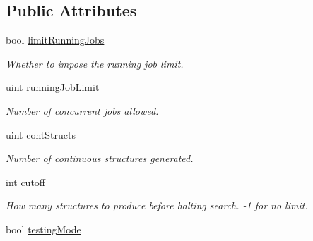 \subsection*{Public Attributes}
\begin{DoxyCompactItemize}
\item 
\hypertarget{classGlobalSearch_1_1OptBase_a3b5202a4793e24dd7d42d1df9e94ee27}{}bool \hyperlink{classGlobalSearch_1_1OptBase_a3b5202a4793e24dd7d42d1df9e94ee27}{limit\+Running\+Jobs}\label{classGlobalSearch_1_1OptBase_a3b5202a4793e24dd7d42d1df9e94ee27}

\begin{DoxyCompactList}\small\item\em Whether to impose the running job limit. \end{DoxyCompactList}\item 
\hypertarget{classGlobalSearch_1_1OptBase_a02fd48b57bdd72ec4a4c20209967bd07}{}uint \hyperlink{classGlobalSearch_1_1OptBase_a02fd48b57bdd72ec4a4c20209967bd07}{running\+Job\+Limit}\label{classGlobalSearch_1_1OptBase_a02fd48b57bdd72ec4a4c20209967bd07}

\begin{DoxyCompactList}\small\item\em Number of concurrent jobs allowed. \end{DoxyCompactList}\item 
\hypertarget{classGlobalSearch_1_1OptBase_a973fbcff3e2abbc66c19236092439ce1}{}uint \hyperlink{classGlobalSearch_1_1OptBase_a973fbcff3e2abbc66c19236092439ce1}{cont\+Structs}\label{classGlobalSearch_1_1OptBase_a973fbcff3e2abbc66c19236092439ce1}

\begin{DoxyCompactList}\small\item\em Number of continuous structures generated. \end{DoxyCompactList}\item 
\hypertarget{classGlobalSearch_1_1OptBase_a6fe1eb9eef50d0c0851c7113cc8f24f0}{}int \hyperlink{classGlobalSearch_1_1OptBase_a6fe1eb9eef50d0c0851c7113cc8f24f0}{cutoff}\label{classGlobalSearch_1_1OptBase_a6fe1eb9eef50d0c0851c7113cc8f24f0}

\begin{DoxyCompactList}\small\item\em How many structures to produce before halting search. -\/1 for no limit. \end{DoxyCompactList}\item 
\hypertarget{classGlobalSearch_1_1OptBase_a4aee28dd2991e1ada81243d05a1f23c9}{}bool \hyperlink{classGlobalSearch_1_1OptBase_a4aee28dd2991e1ada81243d05a1f23c9}{testing\+Mode}\label{classGlobalSearch_1_1OptBase_a4aee28dd2991e1ada81243d05a1f23c9}


\end{DoxyCompactItemize}
